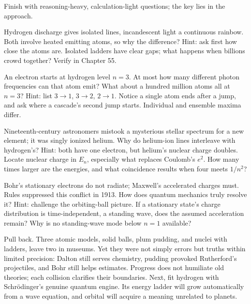 \begin{mainline}
Finish with reasoning-heavy, calculation-light questions; the key lies in the approach.
\end{mainline}

\begin{puzzles}
\item Hydrogen discharge gives isolated lines, incandescent light a continuous rainbow. Both involve heated emitting atoms, so why the difference? Hint: ask first how close the atoms are. Isolated ladders have clear gaps; what happens when billions crowd together? Verify in Chapter 55.
\item An electron starts at hydrogen level \(n=3\). At most how many different photon frequencies can that atom emit? What about a hundred million atoms all at \(n=3\)? Hint: list \(3\to1\), \(3\to2\), \(2\to1\). Notice a single atom ends after a jump, and ask where a cascade's second jump starts. Individual and ensemble maxima differ.
\item Nineteenth-century astronomers mistook a mysterious stellar spectrum for a new element; it was singly ionized helium. Why do helium-ion lines interleave with hydrogen's? Hint: both have one electron, but helium's nuclear charge doubles. Locate nuclear charge in \(E_{n}\), especially what replaces Coulomb's \(e^{2}\). How many times larger are the energies, and what coincidence results when four meets \(1/n^{2}\)?
\item Bohr's stationary electrons do not radiate; Maxwell's accelerated charges must. Rules suppressed this conflict in 1913. How does quantum mechanics truly resolve it? Hint: challenge the orbiting-ball picture. If a stationary state's charge distribution is time-independent, a standing wave, does the assumed acceleration remain? Why is no standing-wave mode below \(n=1\) available?
\end{puzzles}

\begin{mainline}
Pull back. Three atomic models, solid balls, plum pudding, and nuclei with ladders, leave two in museums. Yet they were not simply errors but truths within limited precision: Dalton still serves chemistry, pudding provoked Rutherford's projectiles, and Bohr still helps estimates. Progress does not humiliate old theories; each collision clarifies their boundaries. Next, fit hydrogen with Schrödinger's genuine quantum engine. Its energy ladder will grow automatically from a wave equation, and orbital will acquire a meaning unrelated to planets.
\end{mainline}
